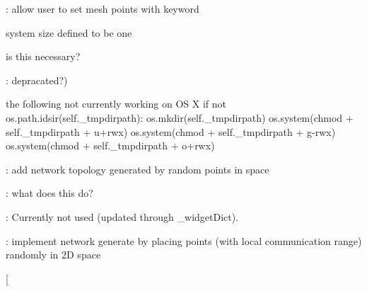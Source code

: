\begin{DoxyRefList}
\+: allow user to set mesh points with keyword 

system size defined to be one  
\item[\label{todo__todo000012}%
\Hypertarget{todo__todo000012}%
Global \hyperlink{class_mu_mo_t_1_1_mu_mo_tmodel_a8ef9f9e4473f46043da1484716b18268}{Mu\+Mo\+Tmodel.\+\_\+funcs} ]is this necessary?  
\item[\label{todo__todo000002}%
\Hypertarget{todo__todo000002}%
Global \hyperlink{class_mu_mo_t_1_1_mu_mo_tmodel_accfd4bbcd94ec3ce4a064fec53921700}{Mu\+Mo\+Tmodel.\+\_\+reactants\+La\+TeX} ]\+: depracated?)  
\item[\label{todo__todo000016}%
\Hypertarget{todo__todo000016}%
Global \hyperlink{class_mu_mo_t_1_1_mu_mo_tmodel_ad2feb50403a36ab7c591c04e0cf33cc4}{Mu\+Mo\+Tmodel.\+\_\+tmpdir} ]the following not currently working on OS X if not os.\+path.\+idsir(self.\+\_\+tmpdirpath)\+: os.\+mkdir(self.\+\_\+tmpdirpath) os.\+system(\textquotesingle{}chmod\textquotesingle{} + self.\+\_\+tmpdirpath + \textquotesingle{}u+rwx\textquotesingle{}) os.\+system(\textquotesingle{}chmod\textquotesingle{} + self.\+\_\+tmpdirpath + \textquotesingle{}g-\/rwx\textquotesingle{}) os.\+system(\textquotesingle{}chmod\textquotesingle{} + self.\+\_\+tmpdirpath + \textquotesingle{}o+rwx\textquotesingle{})  
\item[\label{todo__todo000019}%
\Hypertarget{todo__todo000019}%
Global \hyperlink{class_mu_mo_t_1_1_mu_mo_tmultiagent_controller_a018864aa22d2adb0d3958fb0adbce8e2}{Mu\+Mo\+Tmultiagent\+Controller.\+\_\+progress\+Bar} ]\+: add network topology generated by random points in space  
\item[\label{todo__todo000001}%
\Hypertarget{todo__todo000001}%
Class \hyperlink{class_mu_mo_t_1_1_mu_mo_tmultiagent_view}{Mu\+Mo\+Tmultiagent\+View} ]\+: what does this do?  
\item[\label{todo__todo000040}%
\Hypertarget{todo__todo000040}%
Global \hyperlink{class_mu_mo_t_1_1_mu_mo_tmultiagent_view_a5feff4ca83ee97d6e09874496a4975d4}{Mu\+Mo\+Tmultiagent\+View.\+\_\+plot\+Type} ]\+: Currently not used (updated through \+\_\+widget\+Dict). 
\item[\label{todo__todo000042}%
\Hypertarget{todo__todo000042}%
Global \hyperlink{class_mu_mo_t_1_1_mu_mo_tmultiagent_view_a8be9986760a86837e04718906d18d596}{Mu\+Mo\+Tmultiagent\+View.\+\_\+positions} ]\+: implement network generate by placing points (with local communication range) randomly in 2D space  
\item[\label{todo__todo000043}%
%

\end{DoxyRefList}
